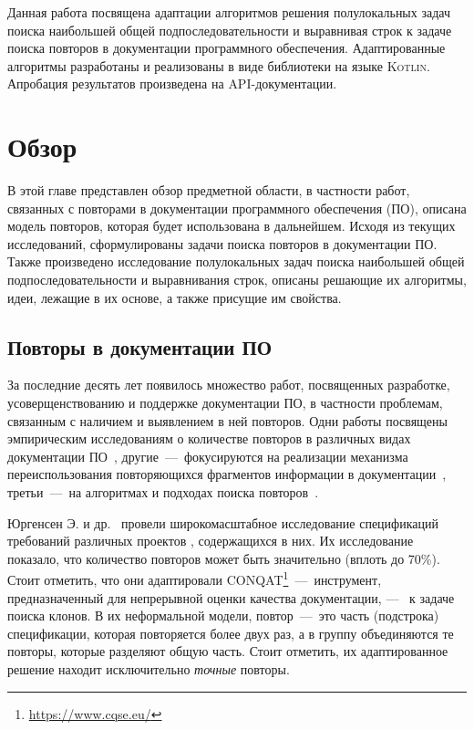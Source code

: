Данная работа посвящена адаптации алгоритмов решения полулокальных задач поиска наибольшей общей подпоследовательности и выравнивая строк к задаче поиска повторов в документации программного обеспечения.
Адаптированные алгоритмы разработаны и реализованы в виде библиотеки на языке \textsc{Kotlin}.
Апробация результатов произведена на {API}-документации.


\section{Обзор}
В этой главе представлен обзор предметной области, в частности работ, связанных с повторами в документации программного обеспечения (ПО), описана модель повторов, которая будет использована в дальнейшем. 
Исходя из текущих исследований, сформулированы задачи поиска повторов в документации ПО.
Также произведено исследование полулокальных задач поиска наибольшей общей подпоследовательности и выравнивания строк, описаны решающие их алгоритмы, %
идеи, лежащие в их основе, а также присущие им свойства.

\subsection{Повторы в документации ПО}\label{duplicateReport}

За последние десять лет появилось множество работ, посвященных разработке, усоверщенствованию и поддержке документации ПО, в частности проблемам, связанным с наличием и выявлением в ней повторов.
Одни работы посвящены эмпирическим исследованиям о количестве повторов  в различных видах документации ПО~\cite{poruban2016preliminary,juergens2010can,oumaziz2017documentation}, другие~---~фокусируются на реализации механизма переиспользования повторяющихся фрагментов информации в документации~\cite{koznov2015clone,horie2010tool,poruban2014reusable}, третьи~---~на алгоритмах и подходах поиска повторов~\cite{luciv2018detecting,luciv2019interactive,blasi2018replicomment,rago2016identifying, soto2015similarity}.

Юргенсен Э. и др.~\cite{juergens2010can} провели широкомасштабное исследование спецификаций требований различных проектов , содержащихся в них. 
Их исследование показало, что количество повторов может быть значительно (вплоть до 70\%). 
Стоит отметить, что они адаптировали \textsc{CONQAT}\footnote{\url{https://www.cqse.eu/}}~---~инструмент, предназначенный для непрерывной оценки качества документации, ---~ к задаче поиска клонов.
В их неформальной модели, повтор~---~это часть (подстрока) спецификации, которая повторяется более двух раз, а в группу объединяются те повторы, которые разделяют общую часть.
Стоит отметить, их адаптированное решение находит исключительно \emph{точные} повторы.

